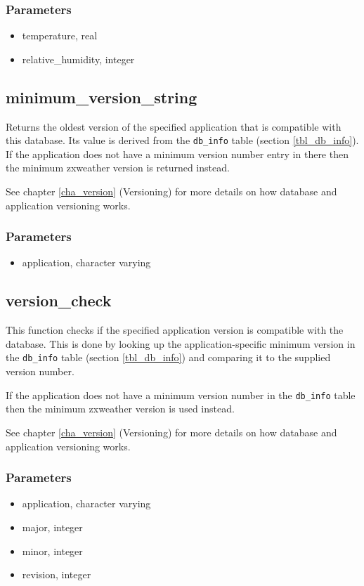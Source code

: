 \documentclass[a4paper,10pt]{book}
\begin{document}
\subsubsection{Parameters}
\begin{itemize}
\item temperature, real
\item relative\_humidity, integer
\end{itemize}

\subsection{minimum\_version\_string}
\label{func_minimum_version_string}

Returns the oldest version of the specified application that is compatible with this database. Its value is derived from the \verb|db_info| table (section \ref{tbl_db_info}). If the application does not have a minimum version number entry in there then the minimum zxweather version is returned instead.

See chapter \ref{cha_version} (Versioning) for more details on how database and application versioning works.

\subsubsection{Parameters}
\begin{itemize}
\item application, character varying
\end{itemize}

\subsection{version\_check}
\label{func_version_check}

This function checks if the specified application version is compatible with the database. This is done by looking up the application-specific minimum version in the \verb|db_info| table (section \ref{tbl_db_info}) and comparing it to the supplied version number. 

If the application does not have a minimum version number in the \verb|db_info| table then the minimum zxweather version is used instead.

See chapter \ref{cha_version} (Versioning) for more details on how database and application versioning works.

\subsubsection{Parameters}
\begin{itemize}
\item application, character varying
\item major, integer
\item minor, integer
\item revision, integer
\end{itemize}
\end{document}
